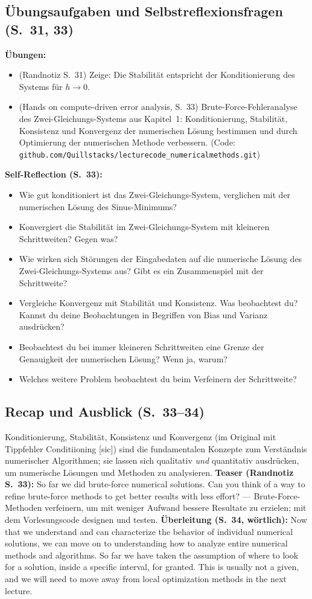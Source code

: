 \subsection{Übungsaufgaben und Selbstreflexionsfragen (S.~31, 33)}
\textbf{Übungen:}
\begin{itemize}[nosep]
  \item (Randnotiz S.~31) Zeige: Die Stabilität entspricht der Konditionierung des Systems für $h \to 0$.
  \item (Hands on compute-driven error analysis, S.~33) Brute-Force-Fehleranalyse des Zwei-Gleichungs-Systems aus Kapitel~1: Konditionierung, Stabilität, Konsistenz und Konvergenz der numerischen Lösung bestimmen und durch Optimierung der numerischen Methode verbessern. (Code: \texttt{github.com/Quillstacks/lecturecode\_numericalmethods.git})
\end{itemize}
\textbf{Self-Reflection (S.~33):}
\begin{itemize}[nosep]
  \item Wie gut konditioniert ist das Zwei-Gleichungs-System, verglichen mit der numerischen Lösung des Sinus-Minimums?
  \item Konvergiert die Stabilität im Zwei-Gleichungs-System mit kleineren Schrittweiten? Gegen was?
  \item Wie wirken sich Störungen der Eingabedaten auf die numerische Lösung des Zwei-Gleichungs-Systems aus? Gibt es ein Zusammenspiel mit der Schrittweite?
  \item Vergleiche Konvergenz mit Stabilität und Konsistenz. Was beobachtest du? Kannst du deine Beobachtungen in Begriffen von Bias und Varianz ausdrücken?
  \item Beobachtest du bei immer kleineren Schrittweiten eine Grenze der Genauigkeit der numerischen Lösung? Wenn ja, warum?
  \item Welches weitere Problem beobachtest du beim Verfeinern der Schrittweite?
\end{itemize}

\subsection{Recap und Ausblick (S.~33--34)}
Konditionierung, Stabilität, Konsistenz und Konvergenz (im Original mit Tippfehler \glqq Conditiioning\grqq{} [sic]) sind die fundamentalen Konzepte zum Verständnis numerischer Algorithmen; sie lassen sich qualitativ \emph{und} quantitativ ausdrücken, um numerische Lösungen und Methoden zu analysieren. \textbf{Teaser (Randnotiz S.~33):} \glqq So far we did brute-force numerical solutions. Can you think of a way to refine brute-force methods to get better results with less effort?\grqq{} — Brute-Force-Methoden verfeinern, um mit weniger Aufwand bessere Resultate zu erzielen; mit dem Vorlesungscode designen und testen. \textbf{Überleitung (S.~34, wörtlich):} \glqq Now that we understand and can characterize the behavior of individual numerical solutions, we can move on to understanding how to analyze entire numerical methods and algorithms. So far we have taken the assumption of where to look for a solution, inside a specific interval, for granted. This is usually not a given, and we will need to move away from local optimization methods in the next lecture.\grqq

